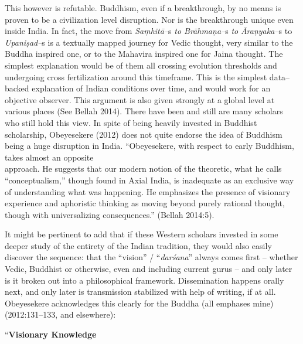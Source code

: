 This however is refutable. Buddhism, even if a breakthrough, by no means is proven to be a civilization level disruption. Nor is the breakthrough unique even inside India. In fact, the move from \textit{Saṃhitā–}s\textit{ to Brāhmaṇa–}s\textit{ to} \textit{Āraṇyaka–}s to \textit{Upaniṣad–}s is a textually mapped journey for Vedic thought, very similar to the Buddha inspired one, or to the Mahavira inspired one for Jaina thought. The simplest explanation would be of them all crossing evolution thresholds and undergoing cross fertilization around this timeframe. This is the simplest data–backed explanation of Indian conditions over time, and would work for an objective observer. This argument is also given strongly at a global level at various places (See Bellah 2014). There have been and still are many scholars who still hold this view. In spite of being heavily invested in Buddhist scholarship, Obeyesekere (2012) does not quite endorse the idea of Buddhism being a huge disruption in India. “Obeyesekere, with respect to early Buddhism, takes almost an opposite\\ approach. He suggests that our modern notion of the theoretic, what he calls “conceptualism,” though found in Axial India, is inadequate as an exclusive way of understanding what was happening. He emphasizes the presence of visionary experience and aphoristic thinking as moving beyond purely rational thought, though with universalizing consequences.” (Bellah 2014:5).

It might be pertinent to add that if these Western scholars invested in some deeper study of the entirety of the Indian tradition, they would also easily discover the sequence: that the “vision” / “\textit{darśana}” always comes first – whether Vedic, Buddhist or otherwise, even and including current gurus – and only later is it broken out into a philosophical framework. Dissemination happens orally next, and only later is transmission stabilized with help of writing, if at all. Obeyesekere acknowledges this clearly for the Buddha (all emphases mine) (2012:131–133, and elsewhere):

\begin{myquote}
“\textbf{Visionary Knowledge}
\end{myquote}


